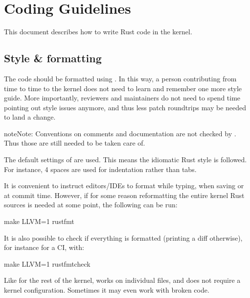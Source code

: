 \documentclass[a4paper,11pt,english]{sphinxmanual}
\begin{document}
\chapter{Coding Guidelines}
\label{\detokenize{coding-guidelines:coding-guidelines}}\label{\detokenize{coding-guidelines::doc}}
This document describes how to write Rust code in the kernel.


\section{Style \& formatting}
\label{\detokenize{coding-guidelines:style-formatting}}
The code should be formatted using . In this way, a person
contributing from time to time to the kernel does not need to learn and
remember one more style guide. More importantly, reviewers and maintainers
do not need to spend time pointing out style issues anymore, and thus
less patch roundtrips may be needed to land a change.

\begin{sphinxadmonition}{note}{Note:}
Conventions on comments and documentation are not checked by
. Thus those are still needed to be taken care of.
\end{sphinxadmonition}

The default settings of  are used. This means the idiomatic Rust
style is followed. For instance, 4 spaces are used for indentation rather
than tabs.

It is convenient to instruct editors/IDEs to format while typing,
when saving or at commit time. However, if for some reason reformatting
the entire kernel Rust sources is needed at some point, the following can be
run:

\begin{sphinxVerbatim}[commandchars=\\\{\}]
make LLVM=1 rustfmt
\end{sphinxVerbatim}

It is also possible to check if everything is formatted (printing a diff
otherwise), for instance for a CI, with:

\begin{sphinxVerbatim}[commandchars=\\\{\}]
make LLVM=1 rustfmtcheck
\end{sphinxVerbatim}

Like  for the rest of the kernel,  works on
individual files, and does not require a kernel configuration. Sometimes it may
even work with broken code.
\end{document}

